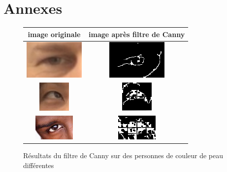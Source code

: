 \section*{Annexes}

\label{resultCanny}
\begin{figure}[H]
  \center
 \begin{tabular}{|c|c|}
  \hline
  image originale & image après filtre de Canny\\
  \hline
  \includegraphics{image/original.png} & \includegraphics{image/canny_final.png}\\
  \hline
  \includegraphics{image/original_asiatique.png} & \includegraphics{image/cannyAsiatique.png}\\
  \hline
  \includegraphics{image/original_black.png} & \includegraphics{image/cannyBlack.png}\\
  \hline
 \end{tabular}
  \caption{Résultats du filtre de Canny sur des personnes de couleur de peau différentes}
\end{figure}



\newpage